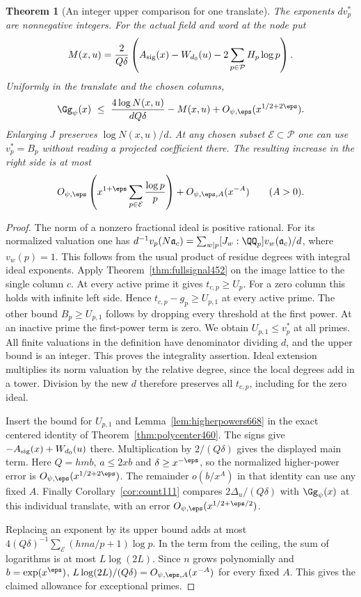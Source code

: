 \documentclass[a4paper,11pt]{article}
\newtheorem{theorem}[proposition]{Theorem}
\theoremstyle{definition}
\theoremstyle{remark}
\numberwithin{equation}{section}
\begin{document}
\begin{theorem}[An integer upper comparison for one translate]
\leavevmode\label{thm:projectedinteger668}
The exponents \(d v_p^*\) are nonnegative integers. For the
actual field and word at the node put
\[
 M(x,u)=\frac{2}{Q\delta}
       \left(A_{\rm sig}(x)-W_{d_0}(u)
                   -2\sum_{p\in\mathcal P}H_p\log p\right).
\]
Uniformly in the translate and the chosen columns,
\[
 \Gg_\psi(x)\ \le\ \frac{4\log N(x,u)}{dQ\delta}
                    -M(x,u)+O_{\psi,\eps}(x^{1/2+2\eps}).
\]
Enlarging \(J\) preserves \(\log N(x,u)/d\).
At any chosen subset \(\mathcal E\subset\mathcal P\) one can
use \(v_p^*=B_p\) without reading a projected coefficient there.
The resulting increase in the right side is at most
\[
 O_{\psi,\eps}\left(x^{1+\eps}
          \sum_{p\in\mathcal E}\frac{\log p}{p}\right)
                     +O_{\psi,\eps,A}(x^{-A})
 \qquad(A>0).
\]
\end{theorem}
\begin{proof}
The norm of a nonzero fractional ideal is positive rational.
For its normalized valuation one has
\(d^{-1}v_p(N\mathfrak a_c)=
\sum_{w\mid p}[J_w:\QQ_p]v_w(\mathfrak a_c)/d\),
where \(v_w(p)=1\). This follows from the usual product of residue
degrees with integral ideal exponents. Apply
Theorem~\ref{thm:fullsignal452} on the image lattice to the
single column \(c\). At every active prime it gives
\(t_{c,p}\ge U_p\). For a zero column this holds with infinite
left side. Hence \(t_{c,p}-g_p\ge U_{p,1}\) at every active
prime. The other bound \(B_p\ge U_{p,1}\) follows by dropping
every threshold at the first power. At an inactive prime the
first-power term is zero. We obtain \(U_{p,1}\le v_p^*\) at all
primes. All finite valuations in the definition have denominator
dividing \(d\), and the upper bound is an integer. This proves
the integrality assertion. Ideal extension multiplies its norm
valuation by the relative degree, since the local degrees add in
a tower. Division by the new \(d\) therefore preserves all
\(t_{c,p}\), including for the zero ideal.

Insert the bound for \(U_{p,1}\) and
Lemma~\ref{lem:higherpowers668} in the exact centered identity
of Theorem~\ref{thm:polycenter460}. The signs give
\(-A_{\rm sig}(x)+W_{d_0}(u)\) there. Multiplication by \(2/(Q\delta)\)
gives the displayed main term. Here \(Q=hmb\), \(a\le2xb\) and
\(\delta\ge x^{-\eps}\), so the normalized higher-power error
is \(O_{\psi,\eps}(x^{1/2+2\eps})\). The remainder
\(o(b/x^A)\) in that identity can use any fixed \(A\).
Finally Corollary~\ref{cor:count111} compares
\(2\Delta_u/(Q\delta)\) with \(\Gg_\psi(x)\) at this individual
translate, with an error \(O_{\psi,\eps}(x^{1/2+\eps/2})\).

Replacing an exponent by its upper bound adds at most
\(4(Q\delta)^{-1}\sum_{\mathcal E}(hma/p+1)\log p\).
In the term from the ceiling, the sum of logarithms is at most
\(L\log(2L)\). Since \(n\) grows polynomially and
\(b=\exp(x^\eps)\), \(L\log(2L)/(Q\delta)=O_{\psi,\eps,A}(x^{-A})\)
for every fixed \(A\). This gives the claimed allowance for
exceptional primes.
\end{proof}
\end{document}
